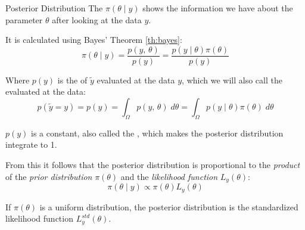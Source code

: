 \begin{definition}{Posterior Distribution}{}{}
    The  $\pi(\theta \mid y)$ shows the information we have
	about the parameter $\theta$ after looking at the data $y$.

	It is calculated using Bayes' Theorem \ref{th:bayes}:
	\begin{equation}
		\pi(\theta \mid y) = \frac{p(y,\,\theta)}{p(y)} = \frac{p(y \mid \theta) \pi(\theta)}{p(y)}
	\end{equation}

    \tcblower

	Where $p(y)$ is the  of $\tilde{y}$ evaluated at the
	data $y$, which we will also call the  evaluated at
	the data:
	\begin{equation}
		p(\tilde y = y) = p(y) = \int_{\Omega} p(y,\,\theta) \;d\theta = \int_{\Omega} p(y \mid \theta) \pi(\theta) \;d\theta
	\end{equation}

	\begin{note}
		$p(y)$ is a constant, also called the , which
		makes the posterior distribution integrate to 1.
	\end{note}

    \tcbline

	From this it follows that the posterior distribution is proportional to the
	\emph{product} of the \emph{prior distribution} $\pi(\theta)$ and the
	\emph{likelihood function} $L_y(\theta)$:
	\begin{equation}
		\pi(\theta \mid y) \propto \pi(\theta) L_y(\theta)
	\end{equation}
\end{definition}

\begin{note}
	If $\pi(\theta)$ is a uniform distribution, the posterior distribution is the
	standardized likelihood function $L_y^{std}(\theta)$.
\end{note}

